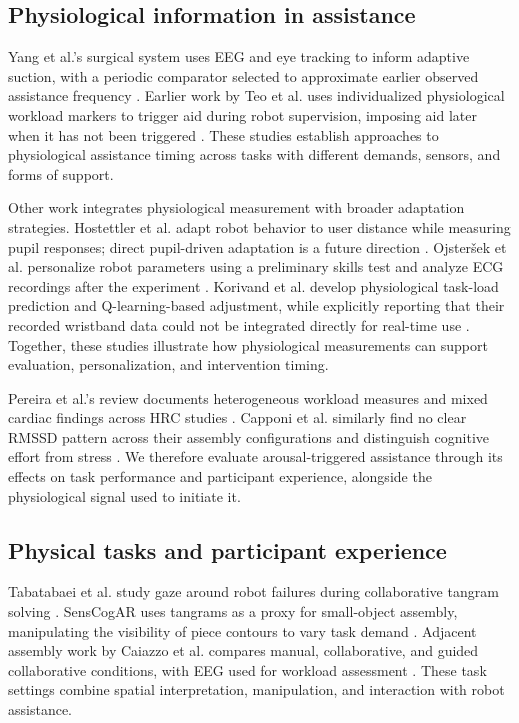 \documentclass[sigconf,anonymous]{aamas}
\begin{document}
\subsection{Physiological information in assistance}

Yang et al.'s surgical system uses EEG and eye tracking to inform adaptive suction, with a periodic comparator selected to approximate earlier observed assistance frequency \cite{yang2024}. Earlier work by Teo et al. uses individualized physiological workload markers to trigger aid during robot supervision, imposing aid later when it has not been triggered \cite{teo2018}. These studies establish approaches to physiological assistance timing across tasks with different demands, sensors, and forms of support.

Other work integrates physiological measurement with broader adaptation strategies. Hostettler et al. adapt robot behavior to user distance while measuring pupil responses; direct pupil-driven adaptation is a future direction \cite{hostettler2025}. Ojsteršek et al. personalize robot parameters using a preliminary skills test and analyze ECG recordings after the experiment \cite{ojstersek2024}. Korivand et al. develop physiological task-load prediction and Q-learning-based adjustment, while explicitly reporting that their recorded wristband data could not be integrated directly for real-time use \cite{korivand2024}. Together, these studies illustrate how physiological measurements can support evaluation, personalization, and intervention timing.

Pereira et al.'s review documents heterogeneous workload measures and mixed cardiac findings across HRC studies \cite{pereira2025}. Capponi et al. similarly find no clear RMSSD pattern across their assembly configurations and distinguish cognitive effort from stress \cite{capponi2024}. We therefore evaluate arousal-triggered assistance through its effects on task performance and participant experience, alongside the physiological signal used to initiate it.

\subsection{Physical tasks and participant experience}

Tabatabaei et al. study gaze around robot failures during collaborative tangram solving \cite{tabatabaei2025}. SensCogAR uses tangrams as a proxy for small-object assembly, manipulating the visibility of piece contours to vary task demand \cite{melo2026}. Adjacent assembly work by Caiazzo et al. compares manual, collaborative, and guided collaborative conditions, with EEG used for workload assessment \cite{caiazzo2024}. These task settings combine spatial interpretation, manipulation, and interaction with robot assistance.
\end{document}
